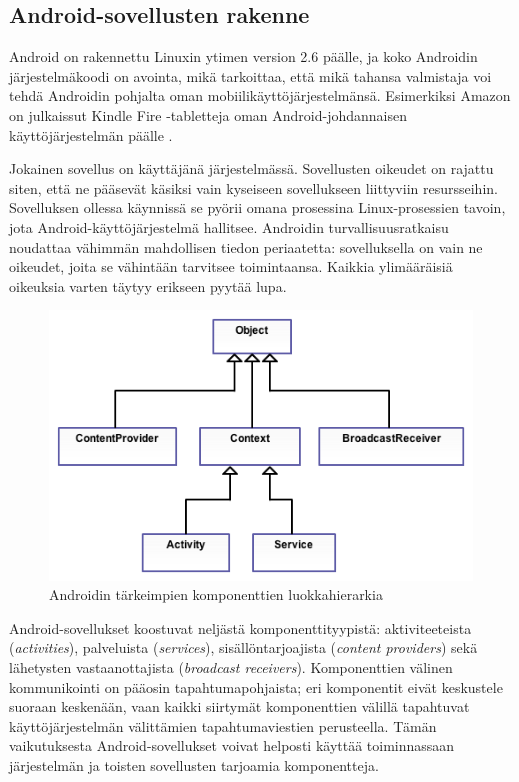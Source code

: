 \subsection{Android-sovellusten rakenne}

Android on rakennettu Linuxin ytimen version 2.6 päälle, ja koko Androidin järjestelmäkoodi on avointa, mikä tarkoittaa, että mikä tahansa valmistaja voi tehdä Androidin pohjalta oman mobiilikäyttöjärjestelmänsä. Esimerkiksi Amazon on julkaissut Kindle Fire -tabletteja oman Android-johdannaisen käyttöjärjestelmän päälle \cite{kindle_fire}. 

Jokainen sovellus on käyttäjänä järjestelmässä. Sovellusten oikeudet on rajattu siten, että ne pääsevät käsiksi vain kyseiseen sovellukseen liittyviin resursseihin. Sovelluksen ollessa käynnissä se pyörii omana prosessina Linux-prosessien tavoin, jota Android-käyttöjärjestelmä hallitsee. Androidin turvallisuusratkaisu noudattaa vähimmän mahdollisen tiedon periaatetta: sovelluksella on vain ne oikeudet, joita se vähintään tarvitsee toimintaansa. Kaikkia ylimääräisiä oikeuksia varten täytyy erikseen pyytää lupa.

\begin{figure}[h]
\centering
\includegraphics[width=130mm]{class_diagram.png}
\caption{Androidin tärkeimpien komponenttien luokkahierarkia} \label{class_diagram}
\end{figure}

Android-sovellukset koostuvat neljästä komponenttityypistä: aktiviteeteista (\emph{activities}), palveluista (\emph{services}), sisällöntarjoajista (\emph{content providers}) sekä lähetysten vastaanottajista (\emph{broadcast receivers}). Komponenttien välinen kommunikointi on pääosin tapahtumapohjaista; eri komponentit eivät keskustele suoraan keskenään, vaan kaikki siirtymät komponenttien välillä tapahtuvat käyttöjärjestelmän välittämien tapahtumaviestien perusteella. Tämän vaikutuksesta Android-sovellukset voivat helposti käyttää toiminnassaan järjestelmän ja toisten sovellusten tarjoamia komponentteja.

